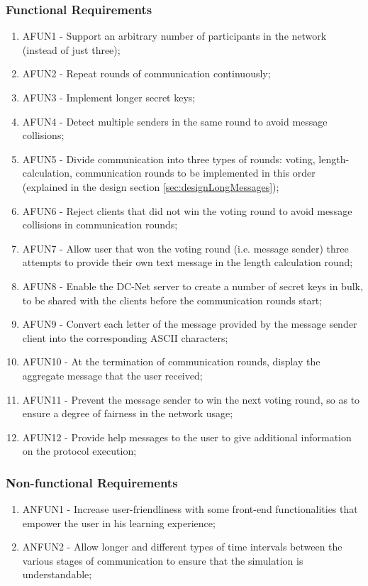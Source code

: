 \subsubsection{Functional Requirements}
\begin{enumerate}
    \item AFUN1 - Support an arbitrary number of participants in the network (instead of just three);
    \item AFUN2 - Repeat rounds of communication continuously;
    \item AFUN3 - Implement longer secret keys;
    \item AFUN4 - Detect multiple senders in the same round to avoid message collisions;
    \item AFUN5 - Divide communication into three types of rounds: voting, length-calculation, communication rounds to be implemented in this order (explained in the design section \ref{sec:designLongMessages});
    \item AFUN6 - Reject clients that did not win the voting round to avoid message collisions in communication rounds;
    \item AFUN7 - Allow user that won the voting round (i.e. message sender) three attempts to provide their own text message in the length calculation round;
    \item AFUN8 - Enable the DC-Net server to create a number of secret keys in bulk, to be shared with the clients before the communication rounds start;
    \item AFUN9 - Convert each letter of the message provided by the message sender client into the corresponding ASCII characters;
    \item AFUN10 - At the termination of communication rounds, display the aggregate message that the user received;
    \item AFUN11 - Prevent the message sender to win the next voting round, so as to ensure a degree of fairness in the network usage;
    \item AFUN12 - Provide help messages to the user to give additional information on the protocol execution;
\end{enumerate}

\subsubsection{Non-functional Requirements}
\begin{enumerate}
    \item ANFUN1 - Increase user-friendliness with some front-end functionalities that empower the user in his learning experience;
    \item ANFUN2 - Allow longer and different types of time intervals between the various stages of communication to ensure that the simulation is understandable;
\end{enumerate}


